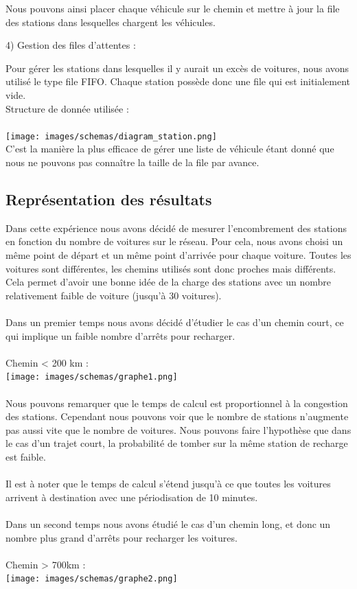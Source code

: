 \documentclass[12pt,titlepage]{report}
\begin{document}
Nous pouvons ainsi placer chaque véhicule sur le chemin et mettre à jour la file des stations dans lesquelles chargent les véhicules.
\\ \par
4) Gestion des files d’attentes :

Pour gérer les stations dans lesquelles il y aurait un excès de voitures, nous avons utilisé le type file FIFO. Chaque station possède donc une file qui est initialement vide.\\

Structure de donnée utilisée :\\ \\
\texttt{[image: images/schemas/diagram\_station.png]}\\

C’est la manière la plus efficace de gérer une liste de véhicule étant donné que nous ne pouvons pas connaître la taille de la file par avance.

\subsection{Représentation des résultats}

Dans cette expérience nous avons décidé de mesurer l'encombrement des stations en fonction du nombre de voitures sur le réseau. Pour cela, nous avons choisi un même point de départ et un même point d’arrivée pour chaque voiture. Toutes les voitures sont différentes, les chemins utilisés sont donc proches mais différents.
Cela permet d’avoir une bonne idée de la charge des stations avec un nombre relativement faible de voiture (jusqu’à 30 voitures).
\\ \\
Dans un premier temps nous avons décidé d’étudier le cas d’un chemin court, ce qui implique un faible nombre d’arrêts pour recharger.
\\ \\
Chemin < 200 km :
\\
\texttt{[image: images/schemas/graphe1.png]}\\
\\
Nous pouvons remarquer que le temps de calcul est proportionnel à la congestion des stations. Cependant nous pouvons voir que le nombre de stations n’augmente pas aussi vite que le nombre de voitures. Nous pouvons faire l’hypothèse que dans le cas d’un trajet court, la probabilité de tomber sur la même station de recharge est faible.
\\ \\
Il est à noter que le temps de calcul s’étend jusqu’à ce que toutes les voitures arrivent à destination avec une périodisation de 10 minutes.
\\ \\
Dans un second temps nous avons étudié le cas d’un chemin long, et donc un nombre plus grand d’arrêts pour recharger les voitures.
\\ \\
Chemin > 700km :
\\
\texttt{[image: images/schemas/graphe2.png]}\\
\end{document}
